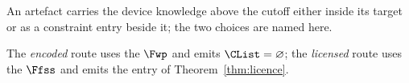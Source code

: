 
An artefact carries the device knowledge above the cutoff either inside its
target or as a constraint entry beside it; the two choices are named here.

\begin{definition}\label{def:routes}
The \emph{encoded} route uses the  $\Fwp$ and
emits $\CList=\varnothing$; the \emph{licensed} route uses the
 $\Ffss$ and emits the entry of
Theorem~\ref{thm:licence}.
\end{definition}
